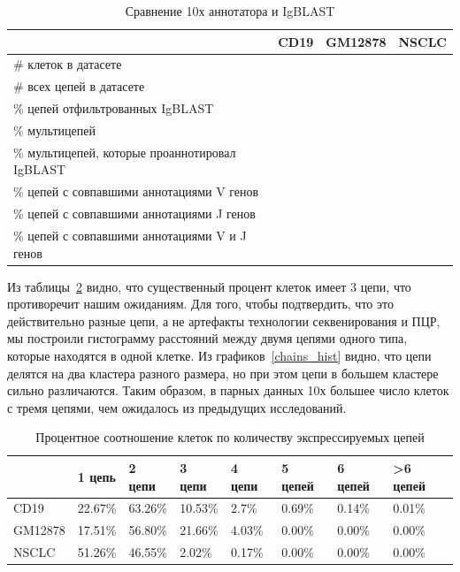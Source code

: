\documentclass{spbau-diploma}
\begin{document}
\begin{table}[h!]
\centering
\begin{tabular}{|l|l|l|l|}
\hline
                    & \textbf{CD19} & \textbf{GM12878} & \textbf{NSCLC} \\ \hline
\# клеток в датасете                           &      &         &       \\ \hline
\# всех цепей в датасете                       &      &         &       \\ \hline
\% цепей отфильтрованных IgBLAST               &      &         &       \\ \hline
\% мультицепей                                 &      &         &       \\ \hline
\% мультицепей, которые проаннотировал IgBLAST &      &         &       \\ \hline
\% цепей с совпавшими аннотациями V генов      &      &         &       \\ \hline
\% цепей с совпавшими аннотациями J генов      &      &         &       \\ \hline
\% цепей с совпавшими аннотациями V и J генов  &      &         &       \\ \hline
\end{tabular}
\caption{Сравнение 10х аннотатора и IgBLAST}
\label{10x_vs_IgBLAST}
\end{table}

Из таблицы~\ref{stats_nchains} видно, что существенный процент клеток имеет $3$ цепи, что противоречит нашим ожиданиям.
Для того, чтобы подтвердить, что это действительно разные цепи, а не артефакты технологии секвенирования и ПЦР, мы построили гистограмму расстояний между двумя цепями одного типа, которые находятся в одной клетке.
Из графиков~\ref{chains_hist} видно, что цепи делятся на два кластера разного размера, но при этом цепи в большем кластере сильно различаются.
Таким образом, в парных данных 10х большее число клеток с тремя цепями, чем ожидалось из предыдущих исследований.

\begin{table}[h!]
\centering
\begin{tabular}{|l|l|l|l|l|l|l|l|}
\hline
        & \textbf{1 цепь} & \textbf{2 цепи} & \textbf{3 цепи} & \textbf{4 цепи} & \textbf{5 цепей} & \textbf{6 цепей} & \textbf{\textgreater{}6 цепей} \\ \hline
CD19    & 22.67\%         & 63.26\%         & 10.53\%         & 2.7\%           & 0.69\%           & 0.14\%           & 0.01\%                         \\ \hline
GM12878 & 17.51\%         & 56.80\%         & 21.66\%         & 4.03\%          & 0.00\%           & 0.00\%           & 0.00\%                         \\ \hline
NSCLC   & 51.26\%         & 46.55\%         & 2.02\%          & 0.17\%          & 0.00\%           & 0.00\%           & 0.00\%                         \\ \hline
\end{tabular}
\caption{Процентное соотношение клеток по количеству экспрессируемых цепей}
\label{stats_nchains}
\end{table}
\end{document}
